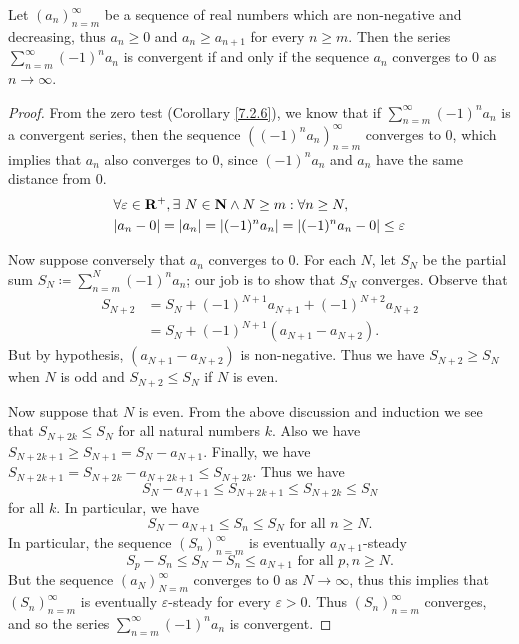 \begin{proposition}\label{7.2.12}
    Let \((a_n)_{n = m}^\infty\) be a sequence of real numbers which are non-negative and decreasing, thus \(a_n \geq 0\) and \(a_n \geq a_{n + 1}\) for every \(n \geq m\).
    Then the series \(\sum_{n = m}^\infty (-1)^n a_n\) is convergent if and only if the sequence \(a_n\) converges to \(0\) as \(n \to \infty\).
\end{proposition}

\begin{proof}
    From the zero test (Corollary \ref{7.2.6}), we know that if \(\sum_{n = m}^\infty (-1)^n a_n\) is a convergent series, then the sequence \(((-1)^n a_n)_{n = m}^\infty\) converges to \(0\), which implies that \(a_n\) also converges to \(0\), since \((-1)^n a_n\) and \(a_n\) have the same distance from \(0\).
    \begin{align*}
         & \forall \varepsilon \in \R^+, \exists\ N \in \N \land N \geq m : \forall n \geq N,   \\
         & \abs{a_n - 0} = \abs{a_n} = \abs{(-1)^n a_n} = \abs{(-1)^n a_n - 0} \leq \varepsilon
    \end{align*}

    Now suppose conversely that \(a_n\) converges to \(0\).
    For each \(N\), let \(S_N\) be the partial sum \(S_N \coloneqq \sum_{n = m}^N (-1)^n a_n\);
    our job is to show that \(S_N\) converges.
    Observe that
    \begin{align*}
        S_{N + 2} & = S_N + (-1)^{N + 1} a_{N + 1} + (-1)^{N + 2} a_{N + 2} \\
                  & = S_N + (-1)^{N + 1} (a_{N + 1} - a_{N + 2}).
    \end{align*}
    But by hypothesis, \((a_{N + 1} - a_{N + 2})\) is non-negative.
    Thus we have \(S_{N + 2} \geq S_N\) when \(N\) is odd and \(S_{N + 2} \leq S_N\) if \(N\) is even.

    Now suppose that \(N\) is even.
    From the above discussion and induction we see that \(S_{N + 2k} \leq S_N\) for all natural numbers \(k\).
    Also we have \(S_{N + 2k + 1} \geq S_{N + 1} = S_N - a_{N + 1}\).
    Finally, we have \(S_{N + 2k + 1} = S_{N + 2k} - a_{N + 2k + 1} \leq S_{N + 2k}\).
    Thus we have
    \[
        S_N - a_{N + 1} \leq S_{N + 2k + 1} \leq S_{N + 2k} \leq S_N
    \]
    for all \(k\).
    In particular, we have
    \[
        S_N - a_{N + 1} \leq S_n \leq S_N \text{ for all } n \geq N.
    \]
    In particular, the sequence \((S_n)_{n = m}^\infty\) is eventually \(a_{N + 1}\)-steady
    \[
        S_p - S_n \leq S_N - S_n \leq a_{N + 1} \text{ for all } p, n \geq N.
    \]
    But the sequence \((a_N)_{N = m}^\infty\) converges to \(0\) as \(N \to \infty\), thus this implies that \((S_n)_{n = m}^\infty\) is eventually \(\varepsilon\)-steady for every \(\varepsilon > 0\).
    Thus \((S_n)_{n = m}^\infty\) converges, and so the series \(\sum_{n = m}^\infty (-1)^n a_n\) is convergent.
\end{proof}

